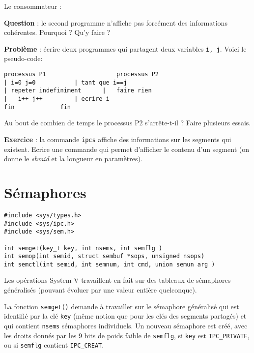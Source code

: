 Le consommateur :


\source




\textbf{Question} : le second programme n'affiche pas forcément des
informations cohérentes. Pourquoi ? Qu'y faire ? 



\textbf{Problème} : écrire deux programmes qui partagent deux variables
\texttt{i, j}. Voici le pseudo-code:

\extrait
\begin{lstlisting}
processus P1                 	processus P2
| i=0 j=0			| tant que i==j 
| repeter indefiniment		|   faire rien
|   i++	j++			| ecrire i
fin				fin
\end{lstlisting}

Au bout de combien de temps le processus P2 s'arrête-t-il ?
Faire plusieurs essais. 


\textbf{Exercice} : la commande \texttt{ipcs} affiche des informations sur les
segments qui existent. Ecrire une commande qui permet d'afficher le contenu 
d'un segment (on donne le \emph{shmid} et la longueur en paramètres).
 
\section{Sémaphores}



\extrait
\begin{lstlisting}
#include <sys/types.h>
#include <sys/ipc.h>
#include <sys/sem.h>   

int semget(key_t key, int nsems, int semflg )
int semop(int semid, struct sembuf *sops, unsigned nsops)
int semctl(int semid, int semnum, int cmd, union semun arg )
\end{lstlisting}


Les opérations System V travaillent en fait sur des tableaux de sémaphores 
généralisés (pouvant évoluer par une valeur entière quelconque). 


La fonction \texttt{semget()} demande à travailler sur le 
sémaphore généralisé qui est identifié par la clé \texttt{key} (même notion que pour les clés
des segments partagés) et qui contient \texttt{nsems} sémaphores individuels.
Un nouveau sémaphore est créé, avec les droits donnés par les 9 bits de 
poids faible de \texttt{semflg}, si
\texttt{key} est \texttt{IPC\_PRIVATE}, ou si
\texttt{semflg} contient \texttt{IPC\_CREAT}. 



